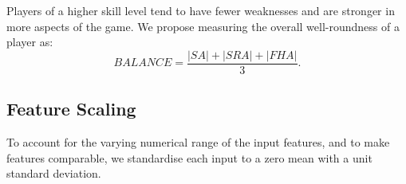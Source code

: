 Players of a higher skill level tend to have fewer weaknesses and are stronger in more aspects of the game. We propose measuring the overall well-roundness of a player as:
\begin{equation}
    \textit{BALANCE} = \frac{|\textit{SA}|+|\textit{SRA}|+|\textit{FHA}|}{3}.
\end{equation}


\subsection{Feature Scaling}
To account for the varying numerical range of the input features, and to make features comparable, we standardise each input to a zero mean with a unit standard deviation.
